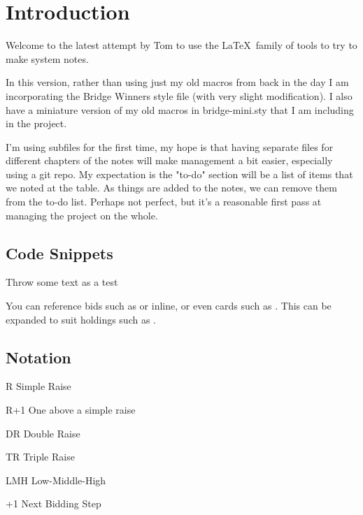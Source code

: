 \documentclass[tom-ari]{subfile}
\begin{document}
\chapter{Introduction}

Welcome to the latest attempt by Tom to use the \LaTeX~family of tools to try to make system notes.  

In this version, rather than using just my old macros from back in the day I am incorporating the Bridge Winners style file (with very slight modification).  I also have a miniature version of my old macros in bridge-mini.sty that I am including in the project.

I'm using subfiles for the first time, my hope is that having separate files for different chapters of the notes will make management a bit easier, especially using a git repo.  
My expectation is the "to-do" section will be a list of items that we noted at the table.  As things are added to the notes, we can remove them from the to-do list.  Perhaps not perfect, but it's a reasonable first pass at managing the project on the whole.

\section{Code Snippets}

Throw some text as a test


You can reference bids such as    or  inline, or even cards such as    . This can be expanded to suit holdings such as .

\section{Notation}

\begin{des}
	\item[R] Simple Raise
	\item[R+1] One above a simple raise
	\item[DR] Double Raise
	\item[TR] Triple Raise
	\item[LMH] Low-Middle-High
	\item[+1] Next Bidding Step
\end{des}
\end{document}
